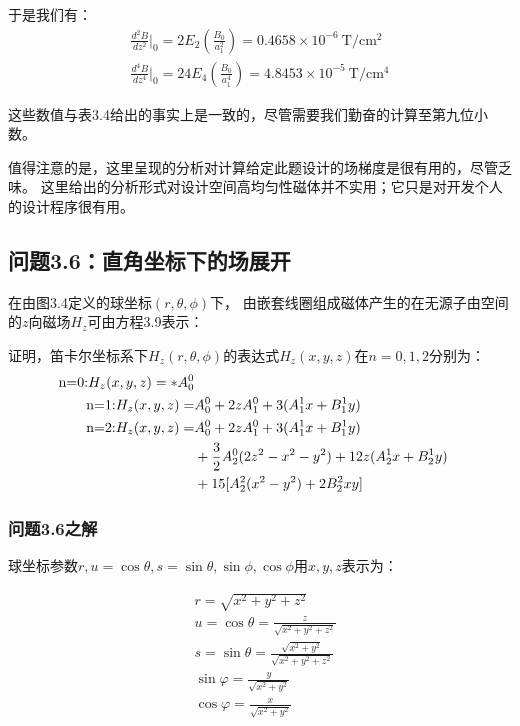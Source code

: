 于是我们有：
\begin{eqnarray*}%
\frac{d^2B}{dz^2}\big|_0=2E_2(\frac{B_0}{a_{1}^{2}})=0.4658\times 10^{-6}\ \mathrm{T/cm^2}\\
\frac{d^4B}{dz^4}\big|_0=24E_4(\frac{B_0}{a_{1}^{4}})=4.8453\times 10^{-5}\ \mathrm{T/cm^4}
\end{eqnarray*}

这些数值与表3.4给出的事实上是一致的，尽管需要我们勤奋的计算至第九位小数。

值得注意的是，这里呈现的分析对计算给定此题设计的场梯度是很有用的，尽管乏味。
这里给出的分析形式对设计空间高均匀性磁体并不实用；它只是对开发个人的设计程序很有用。



\subsection{问题3.6：直角坐标下的场展开}
在由图3.4定义的球坐标$(r, \theta,\phi)$下，
由嵌套线圈组成磁体产生的在无源子由空间的$z$向磁场$H_z$可由方程3.9表示：

证明，笛卡尔坐标系下$H_z(r, \theta,\phi)$的表达式$H_z(x, y, z)$在$n=0, 1, 2$分别为：
\begin{subequations}
	\begin{align}
\mbox{n=0:} H_z(x,y,z)=*A_{0}^{0}\\
\mbox{n=1:} H_z(x,y,z)=&A_{0}^{0}+2zA_{1}^{0}+3(A_{1}^{1}x+B_{1}^{1}y)\\
\mbox{n=2:} H_z(x,y,z)=&A_{0}^{0}+2zA_{1}^{0}+3(A_{1}^{1}x+B_{1}^{1}y)\notag\\
&+\frac{3}{2}A_{2}^{0}(2z^2-x^2-y^2)+12z(A_{2}^{1}x+B_{2}^{1}y)\notag\\
&+15[A_{2}^{2}(x^2-y^2)+2B_{2}^{2}xy]
	\end{align}
\end{subequations}


\subsubsection{问题3.6之解}
球坐标参数$r, u = \cos\theta, s = \sin\theta, \sin\phi,\cos\phi$用$x,y,z$表示为：

 \begin{align*}%
&r=\sqrt{x^2+y^2+z^2}\tag{S6.1a}\\
&u=\cos\theta=\frac{z}{\sqrt{x^2+y^2+z^2}}\tag{S6.1b}\\
&s=\sin\theta=\frac{\sqrt{x^2+y^2}}{\sqrt{x^2+y^2+z^2}}\tag{S6.1c}\\
&\sin\varphi=\frac{y}{\sqrt{x^2+y^2}}\tag{S6.1d}\\
&\cos\varphi=\frac{x}{\sqrt{x^2+y^2}}\tag{S6.1e}
\end{align*}

